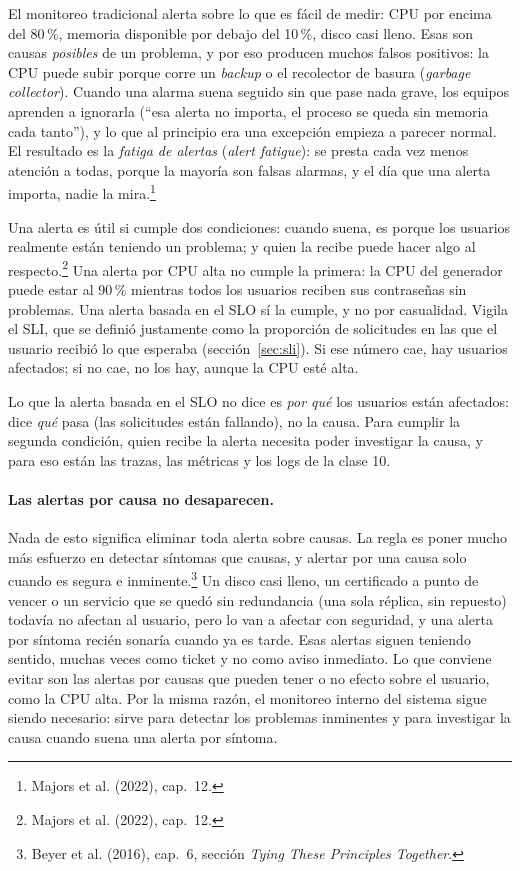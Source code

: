 \documentclass[variant=apuntes,cover=institutional,mode=screen]{ua-engineering-v6-article}
\begin{document}
El monitoreo tradicional alerta sobre lo que es fácil de medir: CPU por encima del 80\,\%, memoria disponible por debajo del 10\,\%, disco casi lleno. Esas son causas \emph{posibles} de un problema, y por eso producen muchos falsos positivos: la CPU puede subir porque corre un \emph{backup} o el recolector de basura (\emph{garbage collector}). Cuando una alarma suena seguido sin que pase nada grave, los equipos aprenden a ignorarla (``esa alerta no importa, el proceso se queda sin memoria cada tanto''), y lo que al principio era una excepción empieza a parecer normal. El resultado es la \emph{fatiga de alertas} (\emph{alert fatigue}): se presta cada vez menos atención a todas, porque la mayoría son falsas alarmas, y el día que una alerta importa, nadie la mira.\footnote{Majors et al. (2022), cap.~12.}

Una alerta es útil si cumple dos condiciones: cuando suena, es porque los usuarios realmente están teniendo un problema; y quien la recibe puede hacer algo al respecto.\footnote{Majors et al. (2022), cap.~12.} Una alerta por CPU alta no cumple la primera: la CPU del generador puede estar al 90\,\% mientras todos los usuarios reciben sus contraseñas sin problemas. Una alerta basada en el SLO sí la cumple, y no por casualidad. Vigila el SLI, que se definió justamente como la proporción de solicitudes en las que el usuario recibió lo que esperaba (sección~\ref{sec:sli}). Si ese número cae, hay usuarios afectados; si no cae, no los hay, aunque la CPU esté alta.

Lo que la alerta basada en el SLO no dice es \emph{por qué} los usuarios están afectados: dice \emph{qué} pasa (las solicitudes están fallando), no la causa. Para cumplir la segunda condición, quien recibe la alerta necesita poder investigar la causa, y para eso están las trazas, las métricas y los logs de la clase 10.

\paragraph{Las alertas por causa no desaparecen.} Nada de esto significa eliminar toda alerta sobre causas. La regla es poner mucho más esfuerzo en detectar síntomas que causas, y alertar por una causa solo cuando es segura e inminente.\footnote{Beyer et al. (2016), cap.~6, sección \emph{Tying These Principles Together}.} Un disco casi lleno, un certificado a punto de vencer o un servicio que se quedó sin redundancia (una sola réplica, sin repuesto) todavía no afectan al usuario, pero lo van a afectar con seguridad, y una alerta por síntoma recién sonaría cuando ya es tarde. Esas alertas siguen teniendo sentido, muchas veces como ticket y no como aviso inmediato. Lo que conviene evitar son las alertas por causas que pueden tener o no efecto sobre el usuario, como la CPU alta. Por la misma razón, el monitoreo interno del sistema sigue siendo necesario: sirve para detectar los problemas inminentes y para investigar la causa cuando suena una alerta por síntoma.
\end{document}
